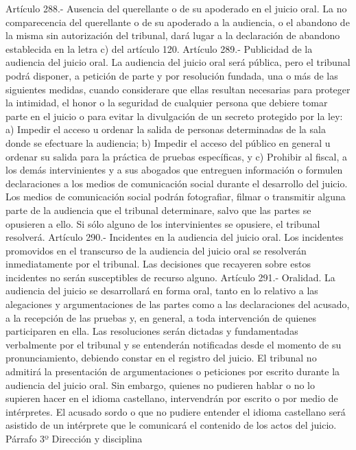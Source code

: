     Artículo 288.- Ausencia del querellante o de su apoderado en el juicio oral. La no comparecencia del querellante o de su apoderado a la audiencia, o el abandono de la misma sin autorización del tribunal, dará lugar a la declaración de abandono establecida en la letra c) del artículo 120.
    Artículo 289.- Publicidad de la audiencia del juicio oral. La audiencia del juicio oral será pública, pero el tribunal podrá disponer, a petición de parte y por resolución fundada, una o más de las siguientes medidas, cuando considerare que ellas resultan necesarias para proteger la intimidad, el honor o la seguridad de cualquier persona que debiere tomar parte en el juicio o para evitar la divulgación de un secreto protegido por la ley:
    a) Impedir el acceso u ordenar la salida de personas determinadas de la sala donde se efectuare la audiencia;
    b) Impedir el acceso del público en general u ordenar su salida para la práctica de pruebas específicas, y
    c) Prohibir al fiscal, a los demás intervinientes y a sus abogados que entreguen información o formulen declaraciones a los medios de comunicación social durante el desarrollo del juicio.
    Los medios de comunicación social podrán fotografiar, filmar o transmitir alguna parte de la audiencia que el tribunal determinare, salvo que las partes se opusieren a ello. Si sólo alguno de los intervinientes se opusiere, el tribunal resolverá.
    Artículo 290.- Incidentes en la audiencia del juicio oral. Los incidentes promovidos en el transcurso de la audiencia del juicio oral se resolverán inmediatamente por el tribunal. Las decisiones que recayeren sobre estos incidentes no serán susceptibles de recurso alguno.
    Artículo 291.- Oralidad. La audiencia del juicio se desarrollará en forma oral, tanto en lo relativo a las alegaciones y argumentaciones de las partes como a las declaraciones del acusado, a la recepción de las pruebas y, en general, a toda intervención de quienes participaren en ella. Las resoluciones serán dictadas y fundamentadas verbalmente por el tribunal y se entenderán notificadas desde el momento de su pronunciamiento, debiendo constar en el registro del juicio.
    El tribunal no admitirá la presentación de argumentaciones o peticiones por escrito durante la audiencia del juicio oral.
    Sin embargo, quienes no pudieren hablar o no lo supieren hacer en el idioma castellano, intervendrán por escrito o por medio de intérpretes.
    El acusado sordo o que no pudiere entender el idioma castellano será asistido de un intérprete que le comunicará el contenido de los actos del juicio.
    Párrafo 3º Dirección y disciplina
